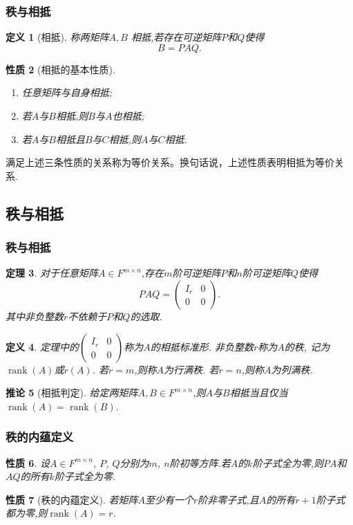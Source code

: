 \documentclass{article}
\DeclareMathOperator{\rank}{rank}
\newtheorem{theorem}{定理}  %
\newtheorem{proposition}[theorem]{性质}  %
\newtheorem{definition}[theorem]{定义}
\newtheorem{corollary}[theorem]{推论}
\renewcommand{\blue }[1]{{\textcolor[rgb]{0,0,1}{#1}}}
\begin{document}
\subsubsection{秩与相抵}
\begin{definition}[相抵] 称两矩阵$A,B$ \blue{相抵},若存在可逆矩阵$P$和$Q$使得
\[B=PAQ.\]
\end{definition}
\begin{proposition}[相抵的基本性质]
\begin{enumerate}
\item  任意矩阵与自身相抵;
\item  若$A$与$B$相抵,则$B$与$A$也相抵;
\item  若$A$与$B$相抵且$B$与$C$相抵,则$A$与$C$相抵.
\end{enumerate}
\end{proposition}
满足上述三条性质的关系称为\blue{等价关系}。换句话说，上述性质表明相抵为等价关系.

\subsection{秩与相抵}

\subsubsection{秩与相抵}
\begin{theorem}
对于任意矩阵$A\in F^{m\times n}$,存在$m$阶可逆矩阵$P$和$n$阶可逆矩阵$Q$使得
\[PAQ=\begin{pmatrix}I_r&0\\0&0\end{pmatrix}.\]
其中非负整数$r$\blue{不依赖}于$P$和$Q$的选取.
\end{theorem}
\begin{definition}
定理中的$\begin{pmatrix}I_r&0\\0&0\end{pmatrix}$称为$A$的\blue{相抵标准形}. 非负整数$r$称为$A$的\blue{秩}, 记为\blue{$\rank(A)$}或\blue{$r(A)$}. 若$r=m$,则称$A$为\blue{行满秩}.
若$r=n$,则称$A$为\blue{列满秩}.
\end{definition}
\begin{corollary}[相抵判定]
给定两矩阵$A,B\in F^{m\times n}$,则$A$与$B$相抵当且仅当$\rank(A)=\rank(B)$.
\end{corollary}

\subsubsection{秩的内蕴定义}
\begin{proposition}
设$A\in F^{m\times n}$, $P$, $Q$分别为$m$, $n$阶初等方阵.若$A$的$k$阶子式全为零,则$PA$和$AQ$的所有$k$阶子式全为零.
\end{proposition}
\begin{proposition}[秩的内蕴定义]
若矩阵$A$至少有一个$r$阶非零子式,且$A$的所有$r+1$阶子式都为零,则$\rank(A)=r$.
\end{proposition}
\newpage
\end{document}
